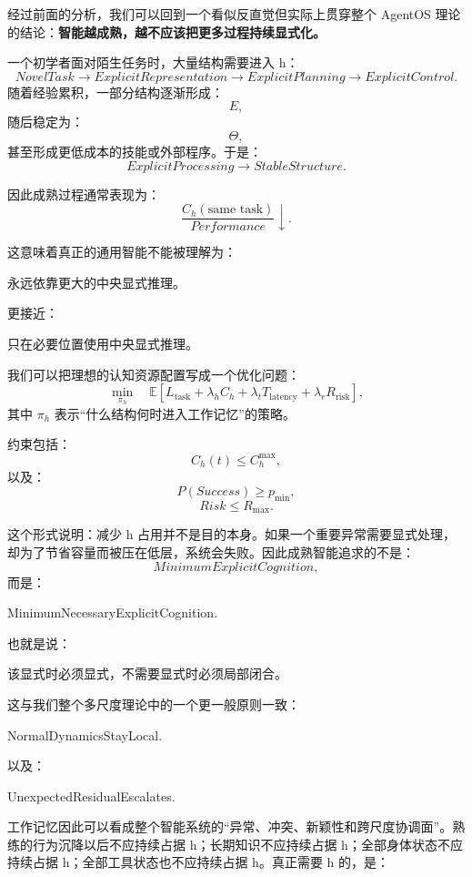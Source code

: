 经过前面的分析，我们可以回到一个看似反直觉但实际上贯穿整个 AgentOS 理论的结论：\textbf{智能越成熟，越不应该把更多过程持续显式化。}

一个初学者面对陌生任务时，大量结构需要进入 h：
\[
NovelTask
\rightarrow
ExplicitRepresentation
\rightarrow
ExplicitPlanning
\rightarrow
ExplicitControl.
\]
随着经验累积，一部分结构逐渐形成：
\[
E,
\]
随后稳定为：
\[
\Theta,
\]
甚至形成更低成本的技能或外部程序。于是：
\[
ExplicitProcessing
\rightarrow
StableStructure.
\]

因此成熟过程通常表现为：
\[
\frac{C_h(\text{same task})}
{Performance}
\downarrow.
\]

这意味着真正的通用智能不能被理解为：
\begin{statementbox}
永远依靠更大的中央显式推理。
\end{statementbox}
更接近：
\begin{statementbox}
只在必要位置使用中央显式推理。
\end{statementbox}

我们可以把理想的认知资源配置写成一个优化问题：
\[
\min_{\pi_h}
\quad
\mathbb E
\left[
L_{\mathrm{task}}
+
\lambda_hC_h
+
\lambda_tT_{\mathrm{latency}}
+
\lambda_rR_{\mathrm{risk}}
\right],
\]
其中 $\pi_h$ 表示“什么结构何时进入工作记忆”的策略。

约束包括：
\[
C_h(t)\le C_h^{\max},
\]
以及：
\[
P(Success)\geq p_{\min},
\]
\[
Risk\leq R_{\max}.
\]

这个形式说明：减少 h 占用并不是目的本身。如果一个重要异常需要显式处理，却为了节省容量而被压在低层，系统会失败。因此成熟智能追求的不是：
\[
MinimumExplicitCognition,
\]
而是：
\begin{statementbox}
MinimumNecessaryExplicitCognition.
\end{statementbox}

也就是说：
\begin{statementbox}
该显式时必须显式，不需要显式时必须局部闭合。
\end{statementbox}

这与我们整个多尺度理论中的一个更一般原则一致：
\begin{statementbox}
NormalDynamicsStayLocal.
\end{statementbox}
以及：
\begin{statementbox}
UnexpectedResidualEscalates.
\end{statementbox}

工作记忆因此可以看成整个智能系统的“异常、冲突、新颖性和跨尺度协调面”。熟练的行为沉降以后不应持续占据 h；长期知识不应持续占据 h；全部身体状态不应持续占据 h；全部工具状态也不应持续占据 h。真正需要 h 的，是：


